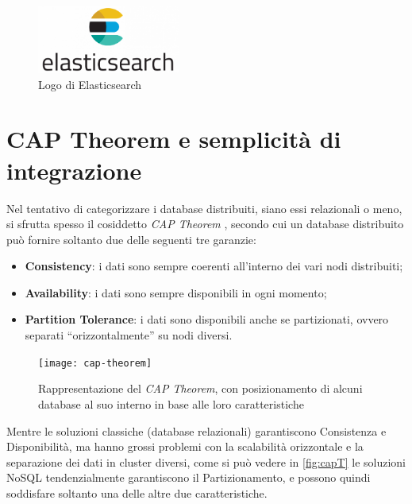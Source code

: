 \begin{figure}[htbp]
\begin{center}
\includegraphics[height=6em]{immagini/tecnologies-logos/Elasticsearch-Logo.png}
\caption{Logo di Elasticsearch}
\label{fig:elastic}
\end{center}
\end{figure}

\section{CAP Theorem e semplicità di integrazione}
\label{sec:cap-theorem-integrazione}

Nel tentativo di categorizzare i database distribuiti, siano essi relazionali o meno, si sfrutta spesso il cosiddetto \textit{CAP Theorem} \cite{site:captheorem}, secondo cui un database distribuito può fornire soltanto due delle seguenti tre garanzie:
\begin{itemize}
    \item \textbf{Consistency}: i dati sono sempre coerenti all'interno dei vari nodi distribuiti;
    \item \textbf{Availability}: i dati sono sempre disponibili in ogni momento;
    \item \textbf{Partition Tolerance}: i dati sono disponibili anche se partizionati, ovvero separati ``orizzontalmente'' su nodi diversi.
\end{itemize}

\vspace{10pt}
\begin{figure}[htbp]
\begin{center}
\texttt{[image: cap-theorem]}
\caption{Rappresentazione del \textit{CAP Theorem}, con posizionamento di alcuni database al suo interno in base alle loro caratteristiche}
\label{fig:capT}
\end{center}
\end{figure}
\vspace{10pt} 

\noindent Mentre le soluzioni classiche (database relazionali) garantiscono Consistenza e Disponibilità, ma hanno grossi problemi con la scalabilità orizzontale e la separazione dei dati in cluster diversi, come si può vedere in \autoref{fig:capT} le soluzioni NoSQL tendenzialmente garantiscono il Partizionamento, e possono quindi soddisfare soltanto una delle altre due caratteristiche.\\

